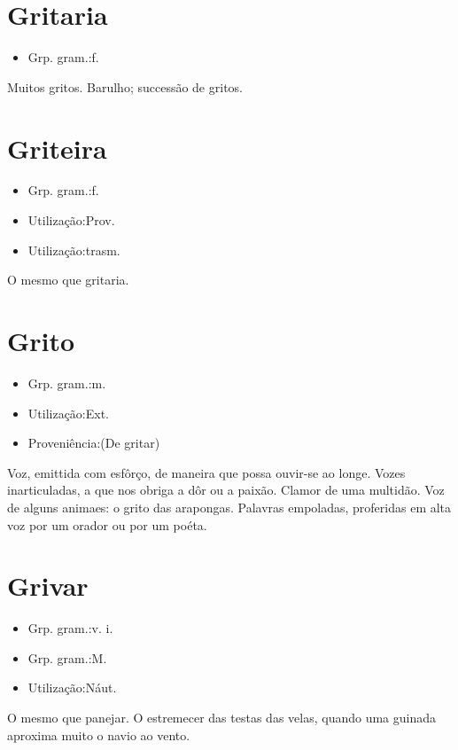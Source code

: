 \section{Gritaria}
\begin{itemize}
\item {Grp. gram.:f.}
\end{itemize}
Muitos gritos.
Barulho; successão de gritos.
\section{Griteira}
\begin{itemize}
\item {Grp. gram.:f.}
\end{itemize}
\begin{itemize}
\item {Utilização:Prov.}
\end{itemize}
\begin{itemize}
\item {Utilização:trasm.}
\end{itemize}
O mesmo que \textunderscore gritaria\textunderscore .
\section{Grito}
\begin{itemize}
\item {Grp. gram.:m.}
\end{itemize}
\begin{itemize}
\item {Utilização:Ext.}
\end{itemize}
\begin{itemize}
\item {Proveniência:(De \textunderscore gritar\textunderscore )}
\end{itemize}
Voz, emittida com esfôrço, de maneira que possa ouvir-se ao longe.
Vozes inarticuladas, a que nos obriga a dôr ou a paixão.
Clamor de uma multidão.
Voz de alguns animaes: \textunderscore o grito das arapongas\textunderscore .
Palavras empoladas, proferidas em alta voz por um orador ou por um poéta.
\section{Grivar}
\begin{itemize}
\item {Grp. gram.:v. i.}
\end{itemize}
\begin{itemize}
\item {Grp. gram.:M.}
\end{itemize}
\begin{itemize}
\item {Utilização:Náut.}
\end{itemize}
O mesmo que \textunderscore panejar\textunderscore .
O estremecer das testas das velas, quando uma guinada aproxima muito o navio ao vento.
